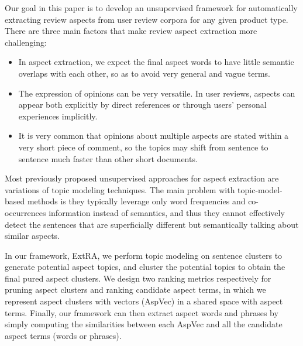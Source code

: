 Our goal in this paper is to develop an unsupervised framework 
for automatically extracting review aspects from user review corpora for any given product type.  
There are three main factors that make review aspect extraction 
more challenging:
\begin{itemize}
    \item 
	In aspect extraction, we expect the final 
	aspect words to have little semantic overlaps with each other, 
	so as to avoid very general and vague terms.
    \item The expression of opinions can be very versatile. 
          In user reviews, aspects can appear both explicitly by 
	direct references or through users' personal experiences implicitly.
    \item It is very common that opinions about multiple aspects are stated within a very short piece of comment, so the topics may shift from sentence to sentence much faster than other short documents.
\end{itemize}

Most previously proposed unsupervised approaches for aspect extraction are 
variations of topic modeling techniques. 
The main problem with topic-model-based methods 
is they typically leverage only word frequencies and co-occurrences information instead of semantics, 
and thus they cannot effectively detect the sentences that are superficially different but semantically talking about similar aspects. 

In our framework, ExtRA, we perform topic modeling on sentence clusters to generate potential aspect topics, and cluster the potential topics to obtain the final pured aspect clusters. 
We design two ranking metrics respectively for pruning aspect clusters and ranking candidate aspect terms, 
in which we represent aspect clusters with vectors (AspVec) in a shared space with aspect terms.
Finally, our framework can then extract aspect words and phrases by simply computing the similarities between each AspVec and all the candidate aspect terms (words or phrases).



